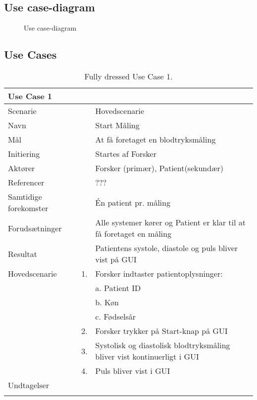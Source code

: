 \subsection{Use case-diagram}

\begin{figure}[H]
	\centering
	\caption{Use case-diagram}
	\label{fig:Use Cases}
\end{figure}



\subsection{Use Cases}

\begin{longtabu} to  %
    {\large \textbf{Use Case 1}} && \\
    \toprule
    Scenarie && Hovedscenarie\\
    Navn && Start Måling\\
    Mål && At få foretaget en blodtryksmåling\\
    Initiering && Startes af Forsker\\
    Aktører && Forsker (primær), Patient(sekundær)\\
    Referencer && ???\\
    Samtidige forekomster  && Én patient pr. måling\\
    Forudsætninger && Alle systemer kører og Patient er klar til at få foretaget en måling\\ 
    Resultat && Patientens systole, diastole og puls bliver vist på GUI\\ \midrule
    Hovedscenarie &    1. &		Forsker indtaster patientoplysninger:\\[-1ex] 
   & &	a. Patient ID\\[-1ex]
   & &  b. Køn\\[-1ex]
   & &  c. Fødselsår\\[-1ex]				 	
                &    2. & Forsker trykker på Start-knap på GUI\\[-1ex]
                &    3. & Systolisk og diastolisk blodtryksmåling bliver vist kontinuerligt i GUI\\[-1ex]
                &    4. & Puls bliver vist i GUI\\ \midrule
                
    Undtagelser &    & \\ \bottomrule
\caption{Fully dressed Use Case 1.}
\label{UC1}
\end{longtabu}

